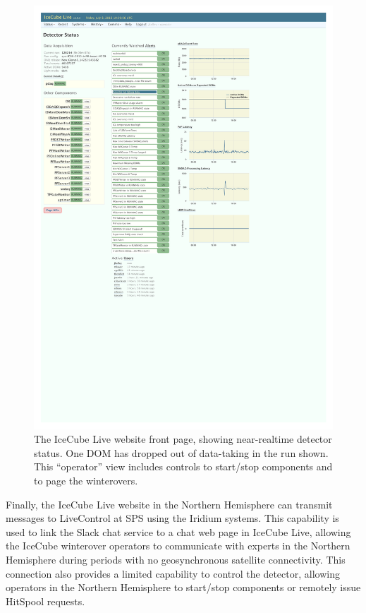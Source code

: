 \begin{figure}[!ht]
 \centering
 \includegraphics[width=1.0\textwidth]{graphics/online/live/live_screenshot_cropped.pdf}
 \caption{The IceCube Live website front page, showing near-realtime detector
   status.  One DOM has dropped out of data-taking in the run shown.  This
   ``operator'' view includes controls to start/stop components and to page
   the winterovers.} 
 \label{fig:live_screenshot}
\end{figure}

Finally, the IceCube Live website in the Northern Hemisphere can transmit
messages to LiveControl at SPS using the Iridium systems.  This capability
is used to link the Slack chat service to a chat web page in
IceCube Live, allowing the IceCube winterover operators to communicate with
experts in the Northern Hemisphere during periods with no geosynchronous satellite
connectivity.  This connection also provides a limited capability to
control the detector, allowing operators in the Northern Hemisphere to
start/stop components or remotely issue HitSpool requests.

